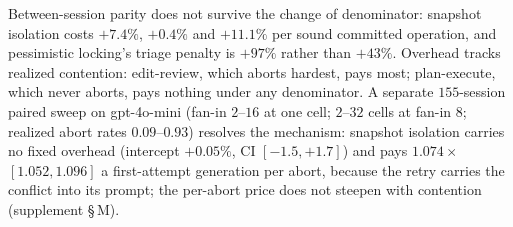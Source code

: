 \begin{table}[t]
\centering
\caption{Token cost of prevention under three denominators, gpt-4o, run
\texttt{\CostRun}. Per sound committed operation is the price we recommend
reading. Underlying counts (commits / sound): edit-review vanilla $212/112$,
pessimistic $101/101$, SI $110/105$; triage vanilla $335/283$, pessimistic
$205/205$, SI $268/256$; plan-execute $\approx200/200$ for all three.}
\label{tab:cost}
\footnotesize
\setlength{\tabcolsep}{3.5pt}
\end{table}

Between-session parity does not survive the change of denominator: snapshot
isolation costs $+7.4\%$, $+0.4\%$ and $+11.1\%$ per sound committed
operation, and pessimistic locking's triage penalty is $+97\%$ rather than
$+43\%$. Overhead tracks realized contention: edit-review, which aborts
hardest, pays most; plan-execute, which never aborts, pays nothing under any
denominator. A separate $155$-session paired sweep on gpt-4o-mini (fan-in
$2$--$16$ at one cell; $2$--$32$ cells at fan-in $8$; realized abort rates
$0.09$--$0.93$) resolves the mechanism: snapshot isolation carries no fixed
overhead (intercept $+0.05\%$, CI $[-1.5,+1.7]$) and pays $1.074\times$
$[1.052, 1.096]$ a first-attempt generation per abort, because the retry
carries the conflict into its prompt; the per-abort price does not steepen
with contention (supplement \S\,M).


